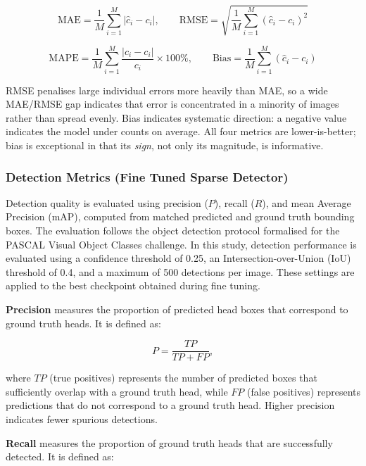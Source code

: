 \documentclass[12pt,a4paper]{report}
\begin{document}
\begin{equation}
	\text{MAE} = \frac{1}{M}\sum_{i=1}^{M} \left| \hat{c}_i - c_i \right|, \qquad
	\text{RMSE} = \sqrt{ \frac{1}{M}\sum_{i=1}^{M} \left( \hat{c}_i - c_i \right)^2 }
\end{equation}

\begin{equation}
	\text{MAPE} = \frac{1}{M}\sum_{i=1}^{M} \frac{\left| \hat{c}_i - c_i \right|}{c_i} \times 100\%, \qquad
	\text{Bias} = \frac{1}{M}\sum_{i=1}^{M} \left( \hat{c}_i - c_i \right)
\end{equation}

RMSE penalises large individual errors more heavily than MAE, so a wide MAE/RMSE gap indicates that error is concentrated in a minority of images rather than spread evenly. Bias indicates systematic direction: a negative value indicates the model under counts on average. All four metrics are lower-is-better; bias is exceptional in that its \emph{sign}, not only its magnitude, is informative.

\subsubsection{Detection Metrics (Fine Tuned Sparse Detector)}

Detection quality is evaluated using precision ($P$), recall ($R$), and mean Average Precision (mAP), computed from matched predicted and ground truth bounding boxes. The evaluation follows the object detection protocol formalised for the PASCAL Visual Object Classes challenge. In this study, detection performance is evaluated using a confidence threshold of 0.25, an Intersection-over-Union (IoU) threshold of 0.4, and a maximum of 500 detections per image. These settings are applied to the best checkpoint obtained during fine tuning.

\textbf{Precision} measures the proportion of predicted head boxes that correspond to ground truth heads. It is defined as:

\begin{equation}
	P = \frac{TP}{TP + FP},
\end{equation}

where $TP$ (true positives) represents the number of predicted boxes that sufficiently overlap with a ground truth head, while $FP$ (false positives) represents predictions that do not correspond to a ground truth head. Higher precision indicates fewer spurious detections.

\textbf{Recall} measures the proportion of ground truth heads that are successfully detected. It is defined as:
\end{document}
